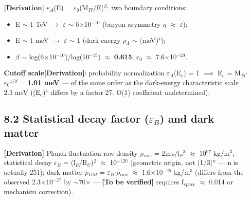 \documentclass[12pt]{article}
\newcommand{\mtag}[1]{\textbf{[#1]}}
\newcommand{\up}[1]{\ensuremath{^{#1}}}
\newcommand{\down}[1]{\ensuremath{_{#1}}}
\begin{document}
\mtag{Derivation} \ensuremath{\varepsilon}\down{A}(E) = \ensuremath{\varepsilon}\down{0}(M\down{Pl}/E)\up{\beta{},} two boundary conditions:
\begin{itemize}
\item E \ensuremath{\sim} 1 TeV \ensuremath{\to} \ensuremath{\varepsilon} \ensuremath{\sim} 6\ensuremath{\times}10\up{-10} (baryon asymmetry \ensuremath{\eta} \ensuremath{\approx} \ensuremath{\varepsilon});
\item E \ensuremath{\sim} 1 meV \ensuremath{\to} \ensuremath{\varepsilon} \ensuremath{\sim} 1 (dark energy \ensuremath{\rho}\down{\Lambda{}} \ensuremath{\sim} (meV)\up{4});
\item \ensuremath{\beta} = log(6\ensuremath{\times}10\up{-10})/log(10\up{-15}) \ensuremath{\approx} \textbf{0.615}, \ensuremath{\varepsilon}\down{0} \ensuremath{\approx} 7.6\ensuremath{\times}10\up{-20}.
\end{itemize}

\textbf{Cutoff scale}\mtag{Derivation}: probability normalization \ensuremath{\varepsilon}\down{A}(E\down{c}) = 1 \ensuremath{\implies} E\down{c} = M\down{Pl}\ensuremath{\cdot}\ensuremath{\varepsilon}\down{0}\up{1/\beta{}} = \textbf{1.01 meV} --- of the same order as the dark-energy characteristic scale 2.3 meV ((E\down{c})\up{4} differs by a factor 27; O(1) coefficient undetermined).

\subsection{8.2 Statistical decay factor (\ensuremath{\varepsilon}\down{B}) and dark matter}

\mtag{Derivation} Planck-fluctuation raw density \ensuremath{\rho}\down{raw} = 2m\down{P}/l\down{P}\up{3} \ensuremath{\approx} 10\up{97} kg/m\up{3}; statistical decay \ensuremath{\varepsilon}\down{B} = (l\down{P}/R\down{U})\up{2} \ensuremath{\approx} 10\up{-120} (geometric origin, not (1/3)\up{n} --- n is actually 251); dark matter \ensuremath{\rho}\down{DM} = \ensuremath{\varepsilon}\down{B}\ensuremath{\cdot}\ensuremath{\rho}\down{raw} \ensuremath{\approx} 1.6\ensuremath{\times}10\up{-25} kg/m\up{3} (differs from the observed 2.3\ensuremath{\times}10\up{-27} by \ensuremath{\sim}70\ensuremath{\times} --- \textbf{\mtag{To be verified}} requires f\down{space} \ensuremath{\approx} 0.014 or mechanism correction).
\end{document}
